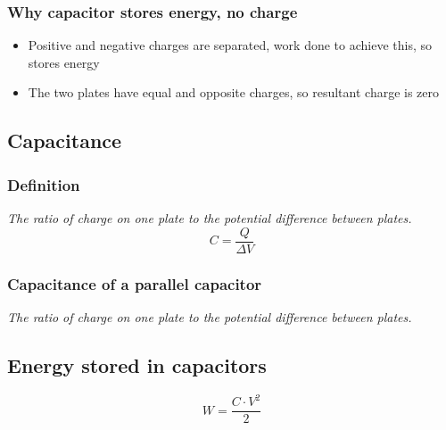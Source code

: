 \documentclass[a4paper,9pt]{scrartcl}
\begin{document}
    \subsubsection{Why capacitor stores energy, no charge}
    \begin{itemize}
        \item Positive and negative charges are separated, work done to achieve this, so stores energy
        \item The two plates have equal and opposite charges, so resultant charge is zero
    \end{itemize}


    \subsection{Capacitance}

    \subsubsection{Definition}
    \textit{The ratio of charge on one plate to the potential difference between plates.}
    \begin{displaymath}
        C = \frac{Q}{\Delta V}
    \end{displaymath}

    \subsubsection{Capacitance of a parallel capacitor}
    \textit{The ratio of charge on one plate to the potential difference between plates.}


    \subsection{Energy stored in capacitors}
    \begin{displaymath}
        W = \frac{C \cdot V^2}{2}
    \end{displaymath}
\end{document}

